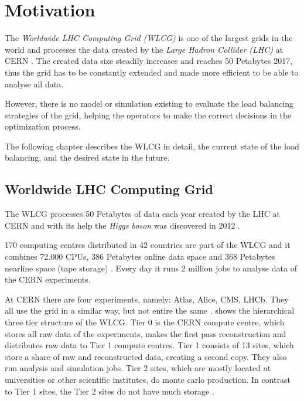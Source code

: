 
\chapter{Motivation}
The \textit{Worldwide LHC Computing Grid (WLCG)} is one of the largest grids in the world and processes the data created by the \textit{Large Hadron Collider (LHC)} at CERN \cite{wlcg_update}. 
The created data size steadily increases and reaches 50 Petabytes 2017, thus the grid has to be constantly extended and made more efficient to be able to analyse all data.

However, there is no model or simulation existing to evaluate the load balancing strategies of the grid,
helping the operators to make the correct decisions in the optimization process.

The following chapter describes the WLCG in detail, the current state of the load balancing, and the desired state in the future.

\section{Worldwide LHC Computing Grid}

The WLCG processes 50 Petabytes of data each year created by the LHC at CERN \cite{data_process}
and with its help the \textit{Higgs boson} was discovered in 2012 \cite{wlcg_online}.

170 computing centres distributed in 42 countries are part of the WLCG and it combines 72.000 CPUs, 386 Petabytes online data space and 368 Petabytes nearline space (tape storage) \cite{wlcg_data}. Every day it runs 2 million jobs to analyse data of the CERN experiments.

At CERN there are four experiments, namely: Atlas, Alice, CMS, LHCb. They all use the grid in a similar way, but not entire the same \cite{wlcg_computing}.  shows the hierarchical three tier structure of the WLCG. Tier 0 is the CERN compute centre, which stores all raw data of the experiments, makes the first pass reconstruction and distributes raw data to Tier 1 compute centres. Tier 1 consists of 13 sites, which store a share of raw and reconstructed data, creating a second copy. They also run analysis and simulation jobs. Tier 2 sites, which are mostly located at universities or other scientific institutes, do monte carlo production. In contrast to Tier 1 sites, the Tier 2 sites do not have much storage \cite{wlcg_computing}.

